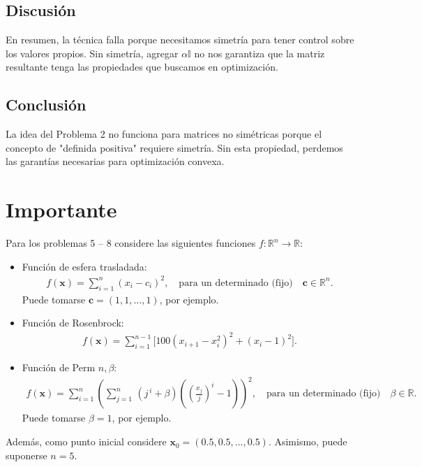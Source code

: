 \documentclass{article}
\begin{document}
\subsection{Discusión}

En resumen, la técnica falla porque necesitamos simetría para tener control sobre los valores propios. Sin simetría, agregar $\alpha \mathbb{I}$ no nos garantiza que la matriz resultante tenga las propiedades que buscamos en optimización.

\subsection{Conclusión}

La idea del Problema 2 no funciona para matrices no simétricas porque el concepto de "definida positiva" requiere simetría. Sin esta propiedad, perdemos las garantías necesarias para optimización convexa.

\section*{Importante}
\setcounter{equation}{0}
Para los problemas 5 -- 8 considere las siguientes funciones $f : \mathbb{R}^n \rightarrow \mathbb{R}$:

\begin{itemize}
    \item Función de esfera trasladada:\\
    \begin{align}
        f(\mathbf{x}) = \sum_{i=1}^{n} (x_i - c_i)^2, \quad \text{para un determinado (fijo)} \quad \mathbf{c} \in \mathbb{R}^n.
    \end{align}
    Puede tomarse $\mathbf{c} = (1,1,\dots,1)$, por ejemplo.

    \item Función de Rosenbrock:\\
    \begin{align}
        f(\mathbf{x}) = \sum_{i=1}^{n-1} \Big[ 100(x_{i+1} - x_i^{2})^{2} + (x_i - 1)^{2} \Big].
    \end{align}

    \item Función de Perm $n,\beta$:\\
    \begin{align}
        f(\mathbf{x}) =
        \sum_{i=1}^{n} \left(
            \sum_{j=1}^{n}\,(j^{\,i} + \beta)\left( \left(\frac{x_j}{j}\right)^{i} - 1 \right)
        \right)^{2}, \quad \text{para un determinado (fijo)} \quad \beta \in \mathbb{R}.
    \end{align}
    Puede tomarse $\beta = 1$, por ejemplo.
\end{itemize}
Además, como punto inicial considere $\mathbf{x}_0 = (0.5,0.5,\dots,0.5)$. Asimismo, puede suponerse $n=5$.
\end{document}
